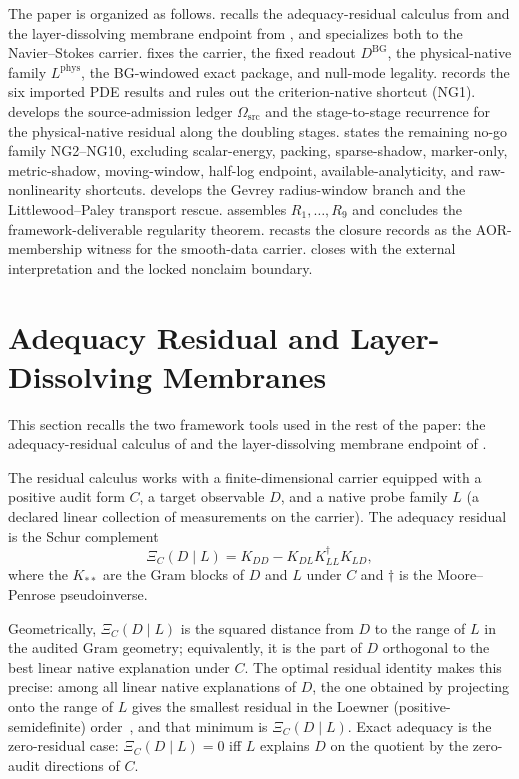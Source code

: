\documentclass[11pt]{article}
\newcommand{\DBG}{D^{\mathrm{BG}}}
\newcommand{\Lphys}{L^{\mathrm{phys}}}
\newcommand{\Omsrc}{\Omega_{\mathrm{src}}}
\theoremstyle{definition}
\begin{document}
The paper is organized as follows.   recalls the
adequacy-residual calculus from \citet{Tsiokos2026XiCompanion} and the
layer-dissolving membrane endpoint from
\citet{Tsiokos2026NeedleKiller}, and specializes both to the
Navier--Stokes carrier.   fixes the carrier, the
fixed readout \(\DBG\), the physical-native family \(\Lphys\), the
BG-windowed exact package, and null-mode legality.  
records the six imported PDE results and rules out the criterion-native
shortcut (NG1).   develops the
source-admission ledger \(\Omsrc\) and the stage-to-stage recurrence
for the physical-native residual along the doubling stages.
 states the remaining no-go family NG2--NG10,
excluding scalar-energy, packing, sparse-shadow, marker-only,
metric-shadow, moving-window, half-log endpoint, available-analyticity,
and raw-nonlinearity shortcuts.   develops the
Gevrey radius-window branch and the Littlewood--Paley transport rescue.
 assembles \(R_1,\ldots,R_9\) and concludes
the framework-deliverable regularity theorem.
 recasts the closure records as the
AOR-membership witness for the smooth-data carrier.
 closes with the external interpretation and the
locked nonclaim boundary.

 

\section{Adequacy Residual and Layer-Dissolving Membranes}
\label{sec:xi-membrane}

This section recalls the two framework tools used in the rest of the
paper: the adequacy-residual calculus of
\citet{Tsiokos2026XiCompanion} and the layer-dissolving membrane
endpoint of \citet{Tsiokos2026NeedleKiller}.

The residual calculus works with a finite-dimensional carrier equipped
with a positive audit form \(C\), a target observable \(D\), and a
native probe family \(L\) (a declared linear collection of measurements
on the carrier).  The adequacy residual is the Schur complement
\[
  \Xi_C(D\mid L)
  =
  K_{DD}-K_{DL}K_{LL}^{\dagger}K_{LD},
\]
where the \(K_{\ast\ast}\) are the Gram blocks of \(D\) and \(L\) under
\(C\) and \(\dagger\) is the Moore--Penrose pseudoinverse.

Geometrically, \(\Xi_C(D\mid L)\) is the squared distance from \(D\)
to the range of \(L\) in the audited Gram geometry; equivalently, it
is the part of \(D\) orthogonal to the best linear native explanation
under \(C\).  The optimal residual identity makes this precise: among
all linear native explanations of \(D\), the one obtained by projecting
onto the range of \(L\) gives the smallest residual in the Loewner
(positive-semidefinite) order~\citep{Bhatia2007PositiveDefinite}, and
that minimum is \(\Xi_C(D\mid L)\).  Exact adequacy is the zero-residual case:
\(\Xi_C(D\mid L)=0\) iff \(L\) explains \(D\) on the quotient by the
zero-audit directions of \(C\).
\end{document}
